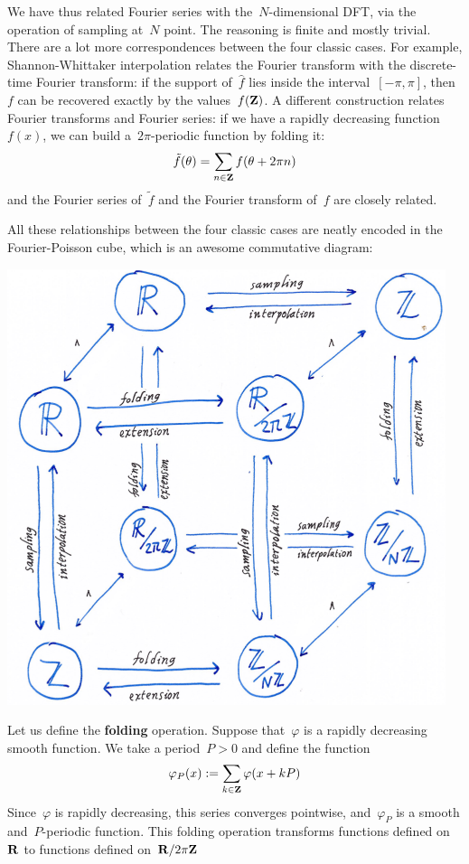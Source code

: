 We have thus related Fourier series with the~$N$-dimensional DFT, via
the operation of sampling at~$N$ point.  The reasoning is finite and
mostly trivial.  There are a lot more correspondences between the
four classic cases.  For example, Shannon-Whittaker interpolation
relates the Fourier transform with the discrete-time Fourier
transform: if the support of~$\hat f$ lies inside the
interval~$[-\pi,\pi]$, then~$f$ can be recovered exactly by the
values~$f(\mathbf{Z})$.  A different construction relates Fourier transforms
and Fourier series: if we have a rapidly decreasing function~$f(x)$,
we can build a~$2\pi$-periodic function by folding it:
$$
\tilde f(\theta)=\sum_{n\in\mathbf{Z}} f(\theta+2\pi n)
$$
and the Fourier series of~$\tilde f$  and the Fourier transform
of~$f$ are closely related.

All these relationships between the four classic cases are neatly
encoded in the Fourier-Poisson cube, which is an awesome commutative
diagram:

\includegraphics{i/hfpcube.png}

\clearpage
Let us define the {\bf folding} operation.
Suppose that~$\varphi$ is a rapidly decreasing smooth function.
We take a period~$P>0$ and define the function
$$
\varphi_P(x):=\sum_{k\in\mathbf{Z}}\varphi(x+kP)
$$
Since~$\varphi$ is rapidly decreasing, this series converges
pointwise, and~$\varphi_P$ is a smooth and~$P$-periodic
function.  This folding operation transforms functions defined on~$\mathbf{R}$ to
functions defined on~$\mathbf{R}/2\pi\mathbf{Z}$

